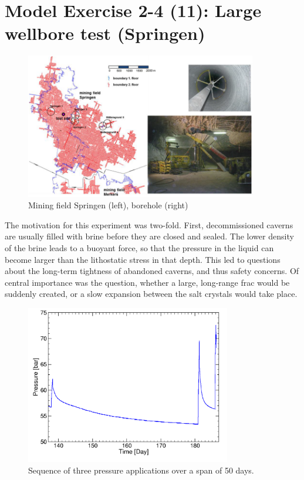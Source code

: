 \section{Model Exercise 2-4 (11): Large wellbore test (Springen)}
\label{sec:mex11}

\begin{figure}[ht]
\centering
\includegraphics[width=0.9\textwidth]{figures/IfG-borehole-overview-small.png}
\caption{Mining field Springen (left), borehole (right)}
\label{fig:largeborehole1}
\end{figure}

The motivation for this experiment was two-fold. First, decommissioned caverns are usually filled with brine before they are closed and sealed. The lower density of the brine leads to a buoyant force, so that the pressure in the liquid can become larger than the lithostatic stress in that depth. This led to questions about the long-term tightness of abandoned caverns, and thus safety concerns. Of central importance was the question, whether a large, long-range frac would be suddenly created, or a slow expansion between the salt crystals would take place. 

\begin{figure}[ht]
\centering
\includegraphics[width=0.8\textwidth]{figures/IfG-Druckkurve-50d.png}
\caption{Sequence of three pressure applications over a span of 50 days.}
\label{fig:largeborehole2}
\end{figure}

